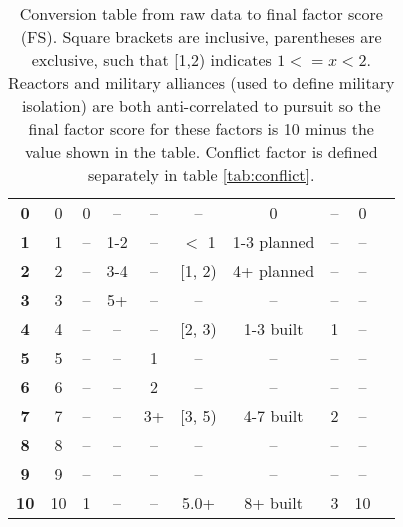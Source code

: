 \begin{table}
\begin{tabular}{|c|c|c|c|c|c|c|c|c|c|}
\hline
\textbf{0}      &  0                     &  0                   &  --                        &  --                     &  --                 &   0                   &    --         &  0           \\   
\textbf{1}      &  1                     &  --                  &  1-2                       &  --                     &  $<$ 1              &   1-3 planned         &    --         &  --          \\
\textbf{2}      &  2                     &  --                  &  3-4                       &  --                     &  [1, 2)             &   4+ planned          &    --         &  --          \\
\textbf{3}      &  3                     &  --                  &  5+                        &  --                     &  --                 &    --                 &    --         &  --          \\
\textbf{4}      &  4                     &  --                  &  --                        &  --                     &  [2, 3)             &    1-3 built          &     1         &  --          \\
\textbf{5}      &  5                     &  --                  &  --                        &  1                      &  --                 &       --              &    --         &  --          \\
\textbf{6}      &  6                     &  --                  &  --                        &  2                      &  --                 &       --              &    --         &  --          \\
\textbf{7}      &  7                     &  --                  &  --                        &  3+                     &  [3, 5)             &    4-7 built          &     2         &  --          \\
\textbf{8}      &  8                     &  --                  &  --                        &  --                     &  --                 &       --              &    --         &  --          \\
\textbf{9}      &  9                     &  --                  &  --                        &  --                     &  --                 &       --              &    --         &  --          \\
\textbf{10}     &  10                    &  1                   &  --                        &  --                     &   5.0+              &    8+ built           &     3         &  10          \\

\hline
\end{tabular}
\caption{Conversion table from raw data to final factor score (FS). Square brackets are inclusive, parentheses are exclusive, such that [1,2) indicates $1<=x<2$. Reactors and military alliances (used to define military isolation) are both anti-correlated to pursuit so the final factor score for these factors is 10 minus the value shown in the table. Conflict factor is defined separately in table \ref{tab:conflict}. }
\label{tab:factor_conversions}
\end{table}


